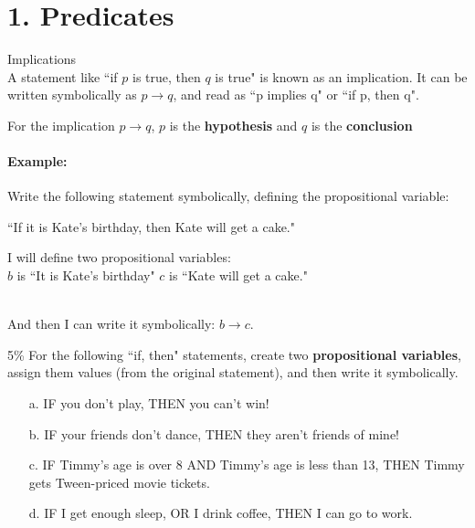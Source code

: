 \documentclass[a4paper,12pt]{book}
\title{}
\author{Rachel Morris}
\date{\today}
\begin{document}
    \toggletrue{answerkey}
    

    \section*{1. Predicates}

        \begin{intro}{Implications} ~\\
            A statement like ``if $p$ is true, then $q$ is true" is known
            as an implication. It can be written symbolically as $p \to q$,
            and read as ``p implies q" or ``if p, then q".

            For the implication $p \to q$, $p$ is the \textbf{hypothesis}
            and $q$ is the \textbf{conclusion}

            \paragraph{Example:} Write the following statement symbolically,
                defining the propositional variable:
                \begin{center} ``If it is Kate's birthday, then Kate will get a cake." \end{center}

                I will define two propositional variables: ~\\
                $b$ is ``It is Kate's birthday" \tab $c$ is ``Kate will get a cake."

                ~\\
                And then I can write it symbolically: $b \to c$.
        \end{intro}

        \begin{question}{1}{5\%}
            For the following ``if, then" statements, create two
            \textbf{propositional variables}, assign them values (from
            the original statement), and then write it symbolically.

            \begin{enumerate}
                \item[a.] IF you don't play, THEN you can't win!
                \item[b.] IF your friends don't dance, THEN they aren't friends of mine!
                \item[c.] IF Timmy's age is over 8 AND Timmy's age is less than 13, THEN Timmy gets Tween-priced movie tickets.
                \item[d.] IF I get enough sleep, OR I drink coffee, THEN I can go to work.
            \end{enumerate}
        \end{question}
\end{document}
